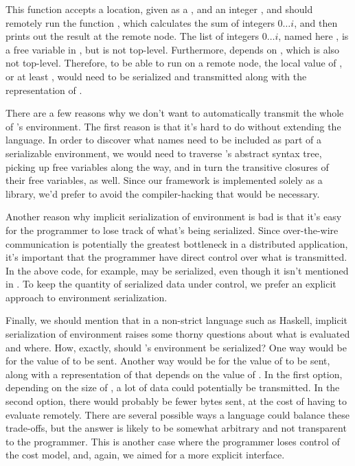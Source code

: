 \documentclass[preprint]{sigplanconf}
\begin{document}
This function accepts a location, given as a , and an integer , and should remotely run the function , which calculates the sum of integers $0 \ldots i$, and then prints out the result at the remote node. The list of integers $0 \ldots i$, named here , is a free variable in , but is not top-level. Furthermore,  depends on , which is also not top-level. Therefore, to be able to run  on a remote node, the local value of , or at least , would need to be serialized and transmitted along with the representation of .

There are a few reasons why we don't want to automatically transmit the whole of 's environment. The first reason is that it's hard to do without extending the language. In order to discover what names need to be included as part of a serializable environment, we would need to traverse 's abstract syntax tree, picking up free variables along the way, and in turn the transitive closures of their free variables, as well. Since our framework is implemented solely as a library, we'd prefer to avoid the compiler-hacking that would be necessary.

Another reason why implicit serialization of environment is bad is that it's easy for the programmer to lose track of what's being serialized. Since over-the-wire communication is potentially the greatest bottleneck in a distributed application, it's important that the programmer have direct control over what is transmitted. In the above code, for example,  may be serialized, even though it isn't mentioned in . To keep the quantity of serialized data under control, we prefer an explicit approach to environment serialization.

Finally, we should mention that in a non-strict language such as Haskell, implicit serialization of environment raises some thorny questions about what is evaluated and where. How, exactly, should 's environment be serialized? One way would be for the value of  to be sent. Another way would be for the value of  to be sent, along with a representation of  that depends on the value of . In the first option, depending on the size of , a lot of data could potentially be transmitted. In the second option, there would probably be fewer bytes sent, at the cost of having to evaluate  remotely. There are several possible ways a language could balance these trade-offs, but the answer is likely to be somewhat arbitrary and not transparent to the programmer. This is another case where the programmer loses control of the cost model, and, again, we aimed for a more explicit interface.
\end{document}
